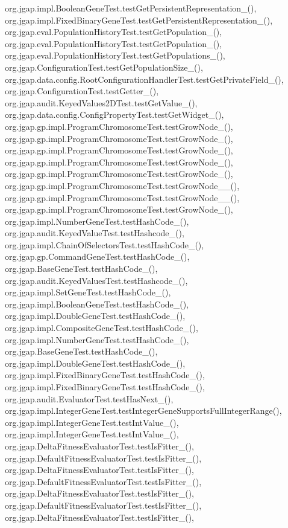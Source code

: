 org.\-jgap.\-impl.\-Boolean\-Gene\-Test.\-test\-Get\-Persistent\-Representation\-\_(), org.\-jgap.\-impl.\-Fixed\-Binary\-Gene\-Test.\-test\-Get\-Persistent\-Representation\-\_(), org.\-jgap.\-eval.\-Population\-History\-Test.\-test\-Get\-Population\-\_(), org.\-jgap.\-eval.\-Population\-History\-Test.\-test\-Get\-Population\-\_(), org.\-jgap.\-eval.\-Population\-History\-Test.\-test\-Get\-Populations\-\_(), org.\-jgap.\-Configuration\-Test.\-test\-Get\-Population\-Size\-\_(), org.\-jgap.\-data.\-config.\-Root\-Configuration\-Handler\-Test.\-test\-Get\-Private\-Field\-\_(), org.\-jgap.\-Configuration\-Test.\-test\-Getter\-\_(), org.\-jgap.\-audit.\-Keyed\-Values2\-D\-Test.\-test\-Get\-Value\-\_(), org.\-jgap.\-data.\-config.\-Config\-Property\-Test.\-test\-Get\-Widget\-\_(), org.\-jgap.\-gp.\-impl.\-Program\-Chromosome\-Test.\-test\-Grow\-Node\-\_(), org.\-jgap.\-gp.\-impl.\-Program\-Chromosome\-Test.\-test\-Grow\-Node\-\_(), org.\-jgap.\-gp.\-impl.\-Program\-Chromosome\-Test.\-test\-Grow\-Node\-\_(), org.\-jgap.\-gp.\-impl.\-Program\-Chromosome\-Test.\-test\-Grow\-Node\-\_(), org.\-jgap.\-gp.\-impl.\-Program\-Chromosome\-Test.\-test\-Grow\-Node\-\_(), org.\-jgap.\-gp.\-impl.\-Program\-Chromosome\-Test.\-test\-Grow\-Node\-\_\-\_(), org.\-jgap.\-gp.\-impl.\-Program\-Chromosome\-Test.\-test\-Grow\-Node\-\_\-\_(), org.\-jgap.\-gp.\-impl.\-Program\-Chromosome\-Test.\-test\-Grow\-Node\-\_(), org.\-jgap.\-impl.\-Number\-Gene\-Test.\-test\-Hash\-Code\-\_(), org.\-jgap.\-audit.\-Keyed\-Value\-Test.\-test\-Hashcode\-\_(), org.\-jgap.\-impl.\-Chain\-Of\-Selectors\-Test.\-test\-Hash\-Code\-\_(), org.\-jgap.\-gp.\-Command\-Gene\-Test.\-test\-Hash\-Code\-\_(), org.\-jgap.\-Base\-Gene\-Test.\-test\-Hash\-Code\-\_(), org.\-jgap.\-audit.\-Keyed\-Values\-Test.\-test\-Hashcode\-\_(), org.\-jgap.\-impl.\-Set\-Gene\-Test.\-test\-Hash\-Code\-\_(), org.\-jgap.\-impl.\-Boolean\-Gene\-Test.\-test\-Hash\-Code\-\_(), org.\-jgap.\-impl.\-Double\-Gene\-Test.\-test\-Hash\-Code\-\_(), org.\-jgap.\-impl.\-Composite\-Gene\-Test.\-test\-Hash\-Code\-\_(), org.\-jgap.\-impl.\-Number\-Gene\-Test.\-test\-Hash\-Code\-\_(), org.\-jgap.\-Base\-Gene\-Test.\-test\-Hash\-Code\-\_(), org.\-jgap.\-impl.\-Double\-Gene\-Test.\-test\-Hash\-Code\-\_(), org.\-jgap.\-impl.\-Fixed\-Binary\-Gene\-Test.\-test\-Hash\-Code\-\_(), org.\-jgap.\-impl.\-Fixed\-Binary\-Gene\-Test.\-test\-Hash\-Code\-\_(), org.\-jgap.\-audit.\-Evaluator\-Test.\-test\-Has\-Next\-\_(), org.\-jgap.\-impl.\-Integer\-Gene\-Test.\-test\-Integer\-Gene\-Supports\-Full\-Integer\-Range(), org.\-jgap.\-impl.\-Integer\-Gene\-Test.\-test\-Int\-Value\-\_(), org.\-jgap.\-impl.\-Integer\-Gene\-Test.\-test\-Int\-Value\-\_(), org.\-jgap.\-Delta\-Fitness\-Evaluator\-Test.\-test\-Is\-Fitter\-\_(), org.\-jgap.\-Default\-Fitness\-Evaluator\-Test.\-test\-Is\-Fitter\-\_(), org.\-jgap.\-Delta\-Fitness\-Evaluator\-Test.\-test\-Is\-Fitter\-\_(), org.\-jgap.\-Default\-Fitness\-Evaluator\-Test.\-test\-Is\-Fitter\-\_(), org.\-jgap.\-Delta\-Fitness\-Evaluator\-Test.\-test\-Is\-Fitter\-\_(), org.\-jgap.\-Default\-Fitness\-Evaluator\-Test.\-test\-Is\-Fitter\-\_(), org.\-jgap.\-Delta\-Fitness\-Evaluator\-Test.\-test\-Is\-Fitter\-\_(), 